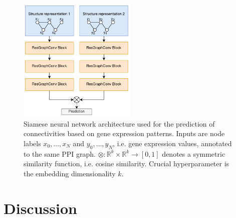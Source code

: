 \documentclass[]{article}
\begin{document}
\begin{figure}
	\centering
	\includegraphics[width=0.5\textwidth]{figures/ConnPred_model.png}
	
	\caption[Siamese neural network architecture used for the prediction of connectivities based on gene expression patterns]{Siamese neural network architecture used for the prediction of connectivities based on gene expression patterns. Inputs are node labels $x_0, \dots, x_N$ and $ y_0, \dots, y_N$, i.e. gene expression values, annotated to the same PPI graph. $\otimes:\mathbb{R}^k\times\mathbb{R}^k\rightarrow[0,1]$ denotes a symmetric similarity function, i.e. cosine similarity. Crucial hyperparameter is the embedding dimensionality $k$. }
	\label{fig:conn_pred_model}
\end{figure}



\newpage
\section{Discussion}
\label{sec:discussion}
\end{document}

